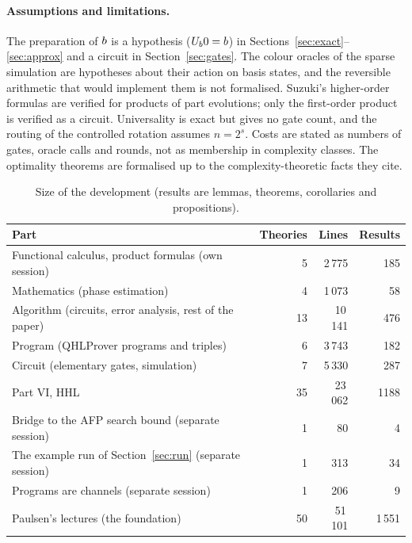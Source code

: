\documentclass[runningheads]{llncs}
\let\ket\relax\let\bra\relax\let\braket\relax\let\ketbra\relax
\newcommand{\ket}[1]{|#1\rangle}
\newcommand{\bra}[1]{\langle #1|}
\newcommand{\braket}[2]{\langle #1|#2\rangle}
\newcommand{\ketbra}[2]{|#1\rangle\langle #2|}
\begin{document}
\paragraph{Assumptions and limitations.} The preparation of $\ket b$ is a hypothesis
($U_b\ket0=b$) in Sections~\ref{sec:exact}--\ref{sec:approx} and a circuit in Section~\ref{sec:gates}. The
colour oracles of the sparse simulation are hypotheses about their action on basis states, and the
reversible arithmetic that would implement them is not formalised. Suzuki's higher-order formulas are
verified for products of part evolutions; only the first-order product is verified as a circuit. Universality is exact but gives no gate count, and the routing of the
controlled rotation assumes $n=2^s$. Costs are stated as numbers of gates, oracle calls and rounds,
not as membership in complexity classes. The optimality theorems are formalised up to the
complexity-theoretic facts they cite.

\begin{table}[t]
\caption{Size of the development (results are lemmas, theorems, corollaries and propositions).}\label{tab:stats}
\centering\small
\begin{tabular}{@{}l@{\qquad}r@{\quad}r@{\quad}r@{}}
\toprule
Part & Theories & Lines & Results\\
\midrule
Functional calculus, product formulas (own session) & 5 & 2\,775 & 185\\
Mathematics (phase estimation) & 4 & 1\,073 & 58\\
Algorithm (circuits, error analysis, rest of the paper) & 13 & 10\,141 & 476\\
Program (QHLProver programs and triples) & 6 & 3\,743 & 182\\
Circuit (elementary gates, simulation) & 7 & 5\,330 & 287\\
\midrule
Part VI, HHL & 35 & 23\,062 & 1188\\
Bridge to the AFP search bound (separate session) & 1 & 80 & 4\\
The example run of Section~\ref{sec:run} (separate session) & 1 & 313 & 34\\
Programs are channels (separate session) & 1 & 206 & 9\\
Paulsen's lectures (the foundation) & 50 & 51\,101 & 1\,551\\
\bottomrule
\end{tabular}
\end{table}
\end{document}
